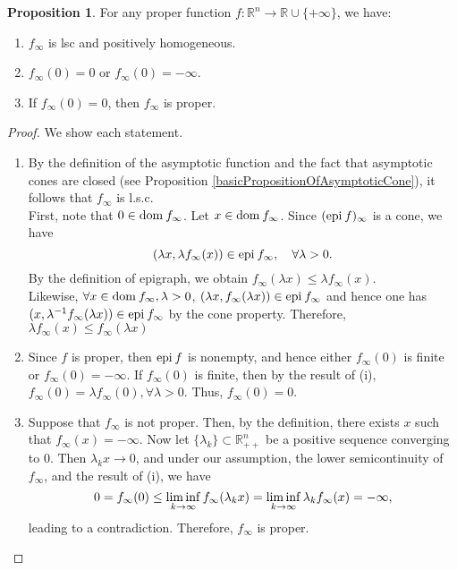 \documentclass[a4paper,11pt, oneside]{book}
\theoremstyle{definition}
\newtheorem{prop}[dfn]{Proposition}
\newcommand{\RealNumberSet}{\mathbb{R}}
\newcommand{\NDemenstionalRealEuclideanSpace}{\mathbb{R}^n}
\newcommand{\Domain}[1]{\text{\rm dom\:${#1}$}} %
\newcommand{\Epigraph}[1]{\text{\rm epi\:${#1}$}} %
\newcommand{\ExtendedRealValuedFunction}[2]{{#1}: {#2} \to \RealNumberSet \cup \{+\infty\}}
\begin{document}
\begin{prop}
  For any proper function $\ExtendedRealValuedFunction{f}{\NDemenstionalRealEuclideanSpace}$, we have:
  \begin{enumerate}[label=\roman*,align=CenterWithParen]
    \item $f_{\infty}$ is lsc and positively homogeneous.
    \item $f_{\infty}(0) = 0$ or $f_{\infty}(0) = - \infty$.
    \item If $f_{\infty}(0) = 0$, then $f_{\infty}$ is proper.
  \end{enumerate}
\end{prop}

\begin{proof}
  We show each statement.
  \begin{enumerate}[label=\roman*,align=CenterWithParen]
    \item By the definition of the asymptotic function and the fact that asymptotic cones are closed (see Proposition \ref{basicPropositionOfAsymptoticCone}), it follows that $f_{\infty}$ is l.s.c. \\
    First, note that $0 \in \Domain{f_{\infty}}$. Let $x \in \Domain{f_{\infty}}$. Since $(\Epigraph{f})_{\infty}$ is a cone, we have
    \begin{equation}
      (\lambda x, \lambda f_{\infty}(x)) \in \Epigraph{f_{\infty}}, \quad \forall \lambda > 0. \notag
    \end{equation}
    By the definition of epigraph, we obtain $f_{\infty} (\lambda x) \leq \lambda f_{\infty}(x)$. \\
    Likewise, $\forall x \in \Domain{f_{\infty}}, \lambda > 0$, $(\lambda x, f_{\infty}(\lambda x)) \in \Epigraph{f_{\infty}}$ and hence one has $(x, \lambda^{-1}f_{\infty}(\lambda x)) \in \Epigraph{f_\infty}$ by the cone property. Therefore, $\lambda f_{\infty}(x) \leq f_{\infty} (\lambda x)$
    \item Since $f$ is proper, then $\Epigraph{f}$ is nonempty, and hence either $f_{\infty}(0)$ is finite or $f_{\infty}(0) = - \infty$. If $f_{\infty}(0)$ is finite, then by the result of (i), $f_{\infty}(0) = \lambda f_{\infty}(0), \forall \lambda > 0$. Thus, $f_{\infty}(0) = 0$.
  \item Suppose that $f_{\infty}$ is not proper. Then, by the definition, there exists $x$ such that $f_{\infty}(x) = -\infty$. Now let $\{\lambda_k\} \subset \NDemenstionalRealEuclideanSpace_{++}$ be a positive sequence converging to $0$. Then $\lambda_k x \rightarrow 0$, and under our assumption, the lower semicontinuity of $f_{\infty}$, and the result of (i), we have
  \begin{equation}
    0 = f_{\infty}(0) \leq \liminf_{k \to \infty} f_{\infty}(\lambda_k x) = \liminf_{k \to \infty} \lambda_k f_{\infty}(x) = - \infty, \notag
  \end{equation}
  leading to a contradiction. Therefore, $f_{\infty}$ is proper.
  \end{enumerate}
\end{proof}
\end{document}
